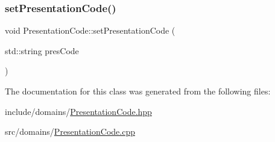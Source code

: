 \subsubsection{\texorpdfstring{setPresentationCode()}{setPresentationCode()}}
{\footnotesize\ttfamily void Presentation\+Code\+::set\+Presentation\+Code (\begin{DoxyParamCaption}\item[{std\+::string}]{pres\+Code }\end{DoxyParamCaption})}



The documentation for this class was generated from the following files\+:\begin{DoxyCompactItemize}
\item 
include/domains/\mbox{\hyperlink{_presentation_code_8hpp}{Presentation\+Code.\+hpp}}\item 
src/domains/\mbox{\hyperlink{_presentation_code_8cpp}{Presentation\+Code.\+cpp}}\end{DoxyCompactItemize}
